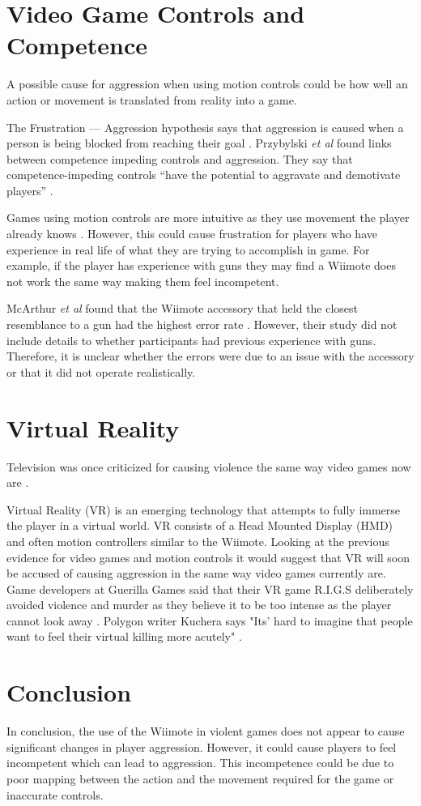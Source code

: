 \documentclass{scrartcl}
\begin{document}
\section{Video Game Controls and Competence}
A possible cause for aggression when using motion controls could be how well an action or movement is translated from reality into a game.  

The Frustration --- Aggression hypothesis says that aggression is caused when a person is being blocked from reaching their goal \cite{dollard1939frustration}.  Przybylski \textit{et al} found links between competence impeding controls and aggression. They say that competence-impeding controls ``have the potential to aggravate and demotivate players” \cite{przybylski}.

Games using motion controls are more intuitive as they use movement the player already knows \cite{Kim}.   However, this could cause frustration for players who have experience in real life of what they are trying to accomplish in game.  For example, if the player has experience with guns they may find a Wiimote does not work the same way making them feel incompetent.
\bigskip

McArthur \textit{et al} found that the Wiimote accessory that held the closest resemblance to a gun had the highest error rate \cite{McArthur}.  However, their study did not include details to whether participants had previous experience with guns. Therefore, it is unclear whether the errors were due to an issue with the accessory or that it did not operate realistically.

 
\section{Virtual Reality}
Television was once criticized for causing violence the same way video games now are \cite{sherry2001effects}. 

Virtual Reality (VR) is an emerging technology that attempts to fully immerse the player in a virtual world.   VR consists of a Head Mounted Display (HMD) and often motion controllers similar to the Wiimote. 
Looking at the previous evidence for video games and motion controls it would suggest that VR will soon be accused of causing aggression in the same way video games currently are. 
Game developers at Guerilla Games said that their VR game R.I.G.S deliberately avoided violence and murder as they believe it to be too intense as the player cannot look away \cite{VRViolence}. 
Polygon writer Kuchera says "Its' hard to imagine that people want to feel their virtual killing more acutely" \cite{PolygonVR}.  

\section{Conclusion}
In conclusion, the use of the Wiimote in violent games does not appear to cause significant changes in player aggression. However, it could cause players to feel incompetent which can lead to aggression. This incompetence could be due to poor mapping between the action and the movement required for the game or inaccurate controls. 
	


	
\end{document}
